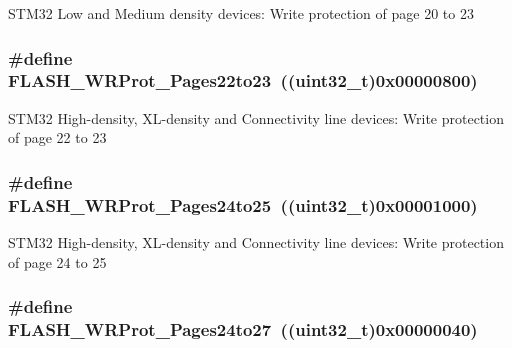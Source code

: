 STM32 Low and Medium density devices: Write protection of page 20 to 23 \hypertarget{group__Option__Bytes__Write__Protection_ga58394c78e6b08542381ade1674efe62c}{
\subsubsection[{FLASH\_\-WRProt\_\-Pages22to23}]{\setlength{\rightskip}{0pt plus 5cm}\#define FLASH\_\-WRProt\_\-Pages22to23~((uint32\_\-t)0x00000800)}}
\label{group__Option__Bytes__Write__Protection_ga58394c78e6b08542381ade1674efe62c}
STM32 High-\/density, XL-\/density and Connectivity line devices: Write protection of page 22 to 23 \hypertarget{group__Option__Bytes__Write__Protection_gac36c4a402c77b28f46451e97dc3632f7}{
\subsubsection[{FLASH\_\-WRProt\_\-Pages24to25}]{\setlength{\rightskip}{0pt plus 5cm}\#define FLASH\_\-WRProt\_\-Pages24to25~((uint32\_\-t)0x00001000)}}
\label{group__Option__Bytes__Write__Protection_gac36c4a402c77b28f46451e97dc3632f7}
STM32 High-\/density, XL-\/density and Connectivity line devices: Write protection of page 24 to 25 \hypertarget{group__Option__Bytes__Write__Protection_ga1d6b94b48e0dd21949139267b90a08ef}{
\subsubsection[{FLASH\_\-WRProt\_\-Pages24to27}]{\setlength{\rightskip}{0pt plus 5cm}\#define FLASH\_\-WRProt\_\-Pages24to27~((uint32\_\-t)0x00000040)}}
\label{group__Option__Bytes__Write__Protection_ga1d6b94b48e0dd21949139267b90a08ef}
